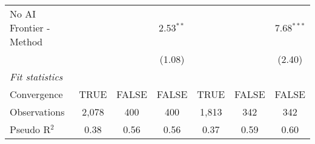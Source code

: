 \begin{tabular}{lcccccc}
   No AI Frontier - Method &              &              & 2.53$^{**}$  &               &              & 7.68$^{***}$\\   
                           &              &              & (1.08)       &               &              & (2.40)\\   
   \midrule
   \emph{Fit statistics}\\
   Convergence             &TRUE          & FALSE        & FALSE        & TRUE          & FALSE        & FALSE\\  
   Observations            & 2,078        & 400          & 400          & 1,813         & 342          & 342\\  
   Pseudo R$^2$            & 0.38         & 0.56         & 0.56         & 0.37          & 0.59         & 0.60\\  
   

\end{tabular}
